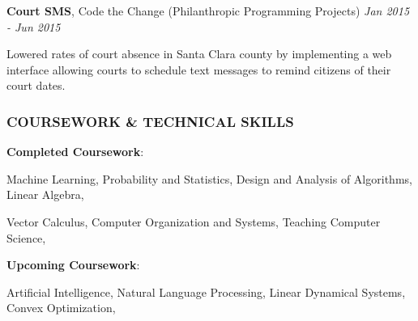 \documentclass[11pt,letterpaper]{article}%
\begin{document}
\vspace{-.3em}
\hspace{.6em}  
{\bf Court SMS}, Code the Change (Philanthropic Programming Projects) \hfill \textit{Jan 2015 - Jun 2015}
\vspace{-.4em}
\begin{itemize*}
\item Lowered rates of court absence in Santa Clara county by implementing a web interface allowing courts to schedule text messages to remind citizens of their court dates.
\end{itemize*}


\vspace{0em}
\subsubsection*{COURSEWORK \& TECHNICAL SKILLS}
\vspace{-2ex}
\hrulefill

\hspace{.6em} 
{\bf Completed Coursework}: 

\hspace{2.4em}
Machine Learning,
Probability and Statistics, 
Design and Analysis of Algorithms, 
Linear Algebra,

\hspace{2.4em}
Vector Calculus,
Computer Organization and Systems, 
Teaching Computer Science,

\hspace{.6em}
{\bf Upcoming Coursework}:

\hspace{2.4em}
Artificial Intelligence, 
Natural Language Processing,
Linear Dynamical Systems,
Convex Optimization,
\end{document}
